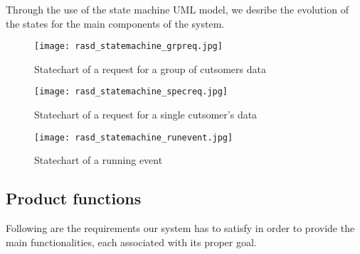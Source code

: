 \documentclass[../main.tex]{subfiles}
\begin{document}
Through the use of the state machine UML model, we desribe the evolution of the states for the main components of the system.

\begin{figure}[H]
	\texttt{[image: rasd\_statemachine\_grpreq.jpg]}
	\caption{Statechart of a request for a group of cutsomers data}
	\label{fig:statemachine_grpreq}
\end{figure}

\begin{figure}[H]
	\texttt{[image: rasd\_statemachine\_specreq.jpg]}
	\caption{Statechart of a request for a single cutsomer's data}
	\label{fig:statemachine_specreq}
\end{figure}

\begin{figure}[H]
	\texttt{[image: rasd\_statemachine\_runevent.jpg]}
	\caption{Statechart of a running event}
	\label{fig:statemachine_runevent}
\end{figure}

\subsection{Product functions}

Following are the requirements our system has to satisfy in order to provide the main functionalities, each associated with its proper goal.
\end{document}
